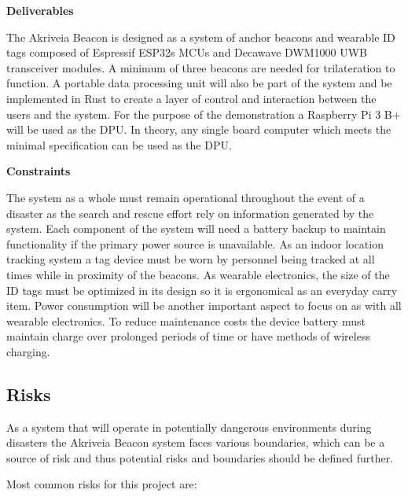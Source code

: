 \bigskip
\textbf{Deliverables}

\medskip
The Akriveia Beacon is designed as a system of anchor beacons and wearable ID tags composed of Espressif ESP32s MCUs and Decawave DWM1000 UWB transceiver modules. A minimum of three beacons are needed for trilateration to function. A portable data processing unit will also be part of the system and be implemented in Rust to create a layer of control and interaction between the users and the system. For the purpose of the demonstration a Raspberry Pi 3 B+ will be used as the DPU. In theory, any single board computer which meets the minimal specification can be used as the DPU.

\bigskip
\textbf{Constraints}

\medskip
The system as a whole must remain operational throughout the event of a disaster as the search and rescue effort rely on information generated by the system. Each component of the system will need a battery backup to maintain functionality if the primary power source is unavailable. As an indoor location tracking system a tag device must be worn by personnel being tracked at all times while in proximity of the beacons. As wearable electronics, the size of the ID tags must be optimized in its design so it is ergonomical as an everyday carry item. Power consumption will be another important aspect to focus on as with all wearable electronics. To reduce maintenance costs the device battery must maintain charge over prolonged periods of time or have methods of wireless charging. 



\pagebreak
\subsection{Risks}
\medskip
As a system that will operate in potentially dangerous environments during disasters the Akriveia Beacon system faces various boundaries, which can be a source of risk and thus potential risks and boundaries should be defined further. 

\bigskip
Most common risks for this project are:

